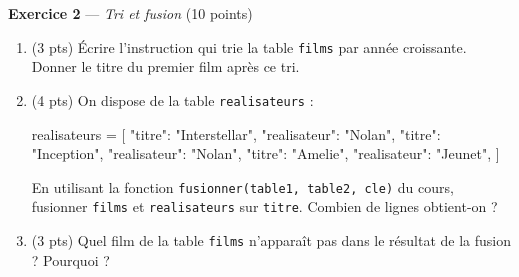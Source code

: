 \bigskip

\textbf{Exercice 2} --- \textit{Tri et fusion} \hfill (10 points)

\begin{enumerate}
  \item (3 pts) Écrire l'instruction qui trie la table \lstinline{films} par année croissante. Donner le titre du premier film après ce tri.
  \item (4 pts) On dispose de la table \lstinline{realisateurs} :
\begin{python}
realisateurs = [
    {"titre": "Interstellar", "realisateur": "Nolan"},
    {"titre": "Inception", "realisateur": "Nolan"},
    {"titre": "Amelie", "realisateur": "Jeunet"},
]
\end{python}
  En utilisant la fonction \lstinline{fusionner(table1, table2, cle)} du cours, fusionner \lstinline{films} et \lstinline{realisateurs} sur \lstinline{titre}. Combien de lignes obtient-on ?
  \item (3 pts) Quel film de la table \lstinline{films} n'apparaît pas dans le résultat de la fusion ? Pourquoi ?
\end{enumerate}

